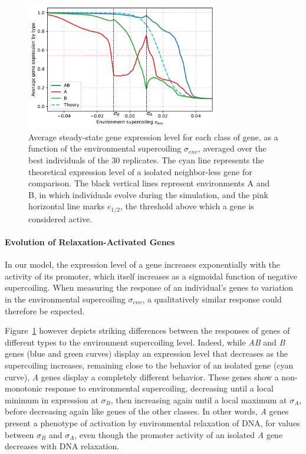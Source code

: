 \begin{figure}[H]
  \centering
  \includegraphics[width=0.75\textwidth]{ploscb/img/activity_sigmas_avg.pdf}
  \caption{Average steady-state gene expression level for each class of gene, as a function of the environmental supercoiling $\sigma_{env}$, averaged over the best individuals of the 30 replicates.
  The cyan line represents the theoretical expression level of a isolated neighbor-less gene for comparison.
  The black vertical lines represent environments A and B, in which individuals evolve during the simulation, and the pink horizontal line marks $e_{1/2}$, the threshold above which a gene is considered active.}
  \label{fig:activity_by_sigma}
\end{figure}

\paragraph{Evolution of Relaxation-Activated Genes}
In our model, the expression level of a gene increases exponentially with the activity of its promoter, which itself increases as a sigmoidal function of negative supercoiling.
When measuring the response of an individual's genes to variation in the environmental supercoiling $\sigma_{env}$, a qualitatively similar response could therefore be expected.

Figure~\ref{fig:activity_by_sigma} however depicts striking differences between the responses of genes of different types to the environment supercoiling level.
Indeed, while \emph{AB} and \emph{B} genes (blue and green curves) display an expression level that decreases as the supercoiling increases, remaining close to the behavior of an isolated gene (cyan curve), \emph{A} genes display a completely different behavior.
These genes show a non-monotonic response to environmental supercoiling, decreasing until a local minimum in expression at $\sigma_B$, then increasing again until a local maximum at $\sigma_A$, before decreasing again like genes of the other classes.
In other words, \emph{A} genes present a phenotype of activation by environmental relaxation of DNA, for values between $\sigma_B$ and $\sigma_A$, even though the promoter activity of an isolated \emph{A} gene decreases with DNA relaxation.


